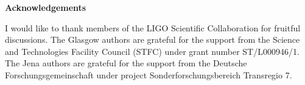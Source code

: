 \vspace*{1.75in}

\begin{center} {\bf Acknowledgements}\end{center}

I would like to thank members of the LIGO Scientific Collaboration for fruitful discussions. The Glasgow authors are grateful for the support from the Science and Technologies Facility Council (STFC) under grant number ST/L000946/1. The Jena authors are grateful for the support from the Deutsche Forschungsgemeinschaft under project Sonderforschungsbereich Transregio 7.